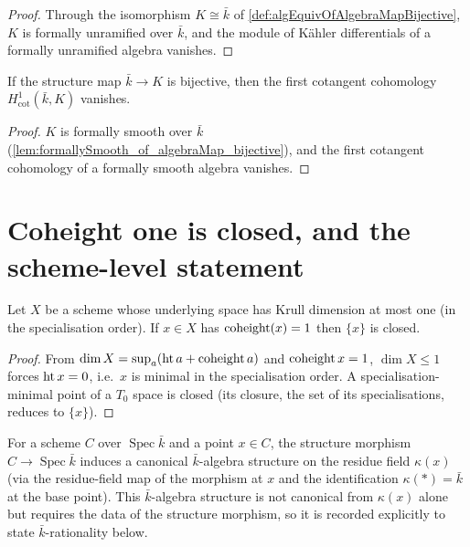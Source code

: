 \begin{proof}
  \leanok
  Through the isomorphism $K \cong \bar k$ of
  \cref{def:algEquivOfAlgebraMapBijective}, $K$ is formally unramified over
  $\bar k$, and the module of Kähler differentials of a formally unramified
  algebra vanishes.
\end{proof}

\begin{lemma}
  \label{lem:subsingleton_h1Cotangent_of_algebraMap_bijective}
  If the structure map $\bar k \to K$ is bijective, then the first cotangent
  cohomology $H^1_{\mathrm{cot}}(\bar k, K)$ vanishes.
\end{lemma}

\begin{proof}
  \leanok
  $K$ is formally smooth over $\bar k$
  (\cref{lem:formallySmooth_of_algebraMap_bijective}), and the first cotangent
  cohomology of a formally smooth algebra vanishes.
\end{proof}

\section{Coheight one is closed, and the scheme-level statement}

\begin{lemma}
  \label{lem:isClosed_singleton_of_coheight_eq_one}
  \leanok
  Let $X$ be a scheme whose underlying space has Krull dimension at most one (in
  the specialisation order).  If $x \in X$ has $\operatorname{coheight}(x) = 1$ then
  $\{x\}$ is closed.
\end{lemma}

\begin{proof}\leanok
  From $\dim X = \sup_a (\operatorname{ht} a + \operatorname{coheight} a)$ and $\operatorname{coheight} x = 1$,
  $\dim X \le 1$ forces $\operatorname{ht} x = 0$, i.e.\ $x$ is minimal in the
  specialisation order.  A specialisation-minimal point of a $T_0$ space is
  closed (its closure, the set of its specialisations, reduces to $\{x\}$).
\end{proof}

\begin{definition}
  \label{def:residueFieldAlgebra}
  For a scheme $C$ over $\operatorname{Spec}\bar k$ and a point $x \in C$, the
  structure morphism $C \to \operatorname{Spec}\bar k$ induces a canonical
  $\bar k$-algebra structure on the residue field $\kappa(x)$ (via the residue-field
  map of the morphism at $x$ and the identification $\kappa(\ast)=\bar k$ at the
  base point).  This $\bar k$-algebra structure is not canonical from $\kappa(x)$
  alone but requires the data of the structure morphism, so it is recorded
  explicitly to state $\bar k$-rationality below.
\end{definition}

